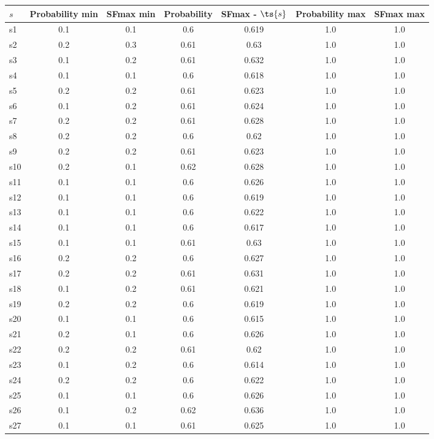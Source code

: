 \documentclass{article}
\begin{document}
\noindent\begin{tabular}{|l|c|c|c|c|c|c|}
\hline
$s$& Probability min & SFmax min & Probability & SFmax - $\ts{s}$ & Probability max & SFmax max\\
\hline
s1 &0.1 & 0.1 & 0.6 & 0.619 & 1.0 & 1.0\\
\hline
s2 &0.2 & 0.3 & 0.61 & 0.63 & 1.0 & 1.0\\
\hline
s3 &0.1 & 0.2 & 0.61 & 0.632 & 1.0 & 1.0\\
\hline
s4 &0.1 & 0.1 & 0.6 & 0.618 & 1.0 & 1.0\\
\hline
s5 &0.2 & 0.2 & 0.61 & 0.623 & 1.0 & 1.0\\
\hline
s6 &0.1 & 0.2 & 0.61 & 0.624 & 1.0 & 1.0\\
\hline
s7 &0.2 & 0.2 & 0.61 & 0.628 & 1.0 & 1.0\\
\hline
s8 &0.2 & 0.2 & 0.6 & 0.62 & 1.0 & 1.0\\
\hline
s9 &0.2 & 0.2 & 0.61 & 0.623 & 1.0 & 1.0\\
\hline
s10 &0.2 & 0.1 & 0.62 & 0.628 & 1.0 & 1.0\\
\hline
s11 &0.1 & 0.1 & 0.6 & 0.626 & 1.0 & 1.0\\
\hline
s12 &0.1 & 0.1 & 0.6 & 0.619 & 1.0 & 1.0\\
\hline
s13 &0.1 & 0.1 & 0.6 & 0.622 & 1.0 & 1.0\\
\hline
s14 &0.1 & 0.1 & 0.6 & 0.617 & 1.0 & 1.0\\
\hline
s15 &0.1 & 0.1 & 0.61 & 0.63 & 1.0 & 1.0\\
\hline
s16 &0.2 & 0.2 & 0.6 & 0.627 & 1.0 & 1.0\\
\hline
s17 &0.2 & 0.2 & 0.61 & 0.631 & 1.0 & 1.0\\
\hline
s18 &0.1 & 0.2 & 0.61 & 0.621 & 1.0 & 1.0\\
\hline
s19 &0.2 & 0.2 & 0.6 & 0.619 & 1.0 & 1.0\\
\hline
s20 &0.1 & 0.1 & 0.6 & 0.615 & 1.0 & 1.0\\
\hline
s21 &0.2 & 0.1 & 0.6 & 0.626 & 1.0 & 1.0\\
\hline
s22 &0.2 & 0.2 & 0.61 & 0.62 & 1.0 & 1.0\\
\hline
s23 &0.1 & 0.2 & 0.6 & 0.614 & 1.0 & 1.0\\
\hline
s24 &0.2 & 0.2 & 0.6 & 0.622 & 1.0 & 1.0\\
\hline
s25 &0.1 & 0.1 & 0.6 & 0.626 & 1.0 & 1.0\\
\hline
s26 &0.1 & 0.2 & 0.62 & 0.636 & 1.0 & 1.0\\
\hline
s27 &0.1 & 0.1 & 0.61 & 0.625 & 1.0 & 1.0\\

\end{tabular}
\end{document}

